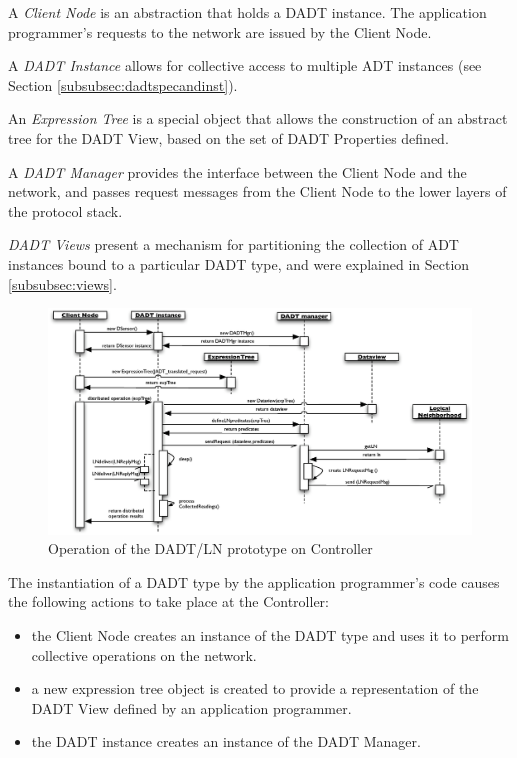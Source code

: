 A \emph{Client Node} is an abstraction that holds a DADT
instance. The application programmer's requests to the network are issued
by the Client Node.
  
A \emph{DADT Instance} allows for collective access to multiple ADT instances (see Section \ref{subsubsec:dadtspecandinst}).

An \emph{Expression Tree} is a special object that allows the construction of an abstract
tree for the DADT View, based on the set of DADT Properties defined.

A \emph{DADT Manager} provides the interface between the Client Node and the
network, and passes request messages from the Client Node to the lower layers
of the protocol stack.

\emph{DADT Views} present a mechanism for partitioning the collection of
ADT instances bound to a particular DADT type, and were explained in Section
\ref{subsubsec:views}.

\begin{figure}
\centering
\includegraphics[width=\textwidth]{img/SeqDiagram_PCnode.eps}
\caption[Operation of the DADT/LN prototype on Controller]{Operation of the DADT/LN prototype on Controller}
\label{Fig:SeqDiagram_PCnode}
\end{figure}

The instantiation of a DADT type by the application programmer's
code causes the following actions to take place at the Controller:
\begin{itemize}
 \item the Client Node creates an instance of the DADT type and uses it 
 to perform collective operations on the network.
  \item a new expression tree object 
  is created to provide a representation of the DADT View defined by an application
  programmer.
  \item the DADT instance creates an instance of the DADT Manager.
\end{itemize}

